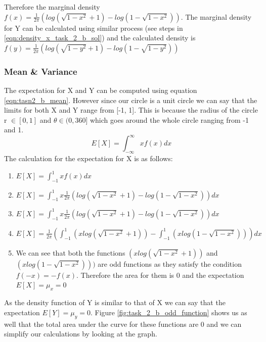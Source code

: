 Therefore the marginal density $f(x) = \frac{1}{2\pi} (log(\sqrt{1-x^2}+1)- log(1-\sqrt{1-x^2}))$. The marginal density for Y can be calculated using similar process (see steps in \ref{eqn:density_x_task_2_b_sol}) and the calculated density is $f(y) =  \frac{1}{2\pi} (log(\sqrt{1-y^2}+1)- log(1-\sqrt{1-y^2}))$

\subsubsection{ Mean \& Variance }
The expectation for X and Y can be computed using equation \ref{eqn:tasn2_b_mean}. However since our circle is a unit circle we can say that the limits for both X and Y range from [-1, 1]. This is because the radius of the circle r $\in [0, 1]$ and $\theta \in (0, 360]$ which goes around the whole circle ranging from -1 and 1.
\begin{equation} \label{eqn:tasn2_b_mean}
    E[X] = \int_{-\infty}^{\infty}xf(x) dx
\end{equation}
The calculation for the expectation for X is as follows:
\begin{enumerate}
    \item $E[X] = \int_{-1}^{1}xf(x) dx$
    \item $E[X] = \int_{-1}^{1}x\frac{1}{2\pi} (log(\sqrt{1-x^2}+1)- log(1-\sqrt{1-x^2})) dx$
    \item $E[X] = \int_{-1}^{1}x\frac{1}{2\pi} (log(\sqrt{1-x^2}+1)- log(1-\sqrt{1-x^2})) dx$
    \item $E[X] = \frac{1}{2\pi} (\int_{-1}^{1}(x log(\sqrt{1-x^2}+1))- \int_{-1}^{1}(x log(1-\sqrt{1-x^2}))) dx$
    \item We can see that both the functions $(x log(\sqrt{1-x^2}+1))$ and $(x log(1-\sqrt{1-x^2})))$ are odd functions as they satisfy the condition $f(-x) = -f(x)$. Therefore the area for them is 0 and the expectation $E[X]=\mu_x = 0$
\end{enumerate}
As the density function of Y is similar to that of X we can say that the expectation $E[Y]=\mu_y = 0$. Figure \ref{fig:task_2_b_odd_function} shows us as well that the total area under the curve for these functions are 0 and we can simplify our calculations by looking at the graph.

